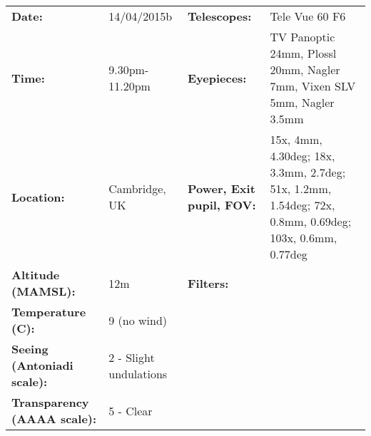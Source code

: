 \begin{tabular}{ p{1.7in} p{1.2in} p{1.5in} p{4.2in}}
{\bf Date:} & 14/04/2015b & {\bf Telescopes:} & Tele Vue 60 F6 \\ 
{\bf Time:} & 9.30pm-11.20pm & {\bf Eyepieces:} & TV Panoptic 24mm, Plossl 20mm, Nagler 7mm, Vixen SLV 5mm, Nagler 3.5mm \\ 
{\bf Location:} & Cambridge, UK & {\bf Power, Exit pupil, FOV:} & 15x, 4mm, 4.30deg; 18x, 3.3mm, 2.7deg; 51x, 1.2mm, 1.54deg; 72x, 0.8mm, 0.69deg; 103x, 0.6mm, 0.77deg \\ 
{\bf Altitude (MAMSL):} & 12m & {\bf Filters:} &  \\ 
{\bf Temperature (C):} & 9 (no wind) & & \\ 
{\bf Seeing (Antoniadi scale):} & 2 - Slight undulations & & \\ 
{\bf Transparency (AAAA scale):} & 5 - Clear & & \\ 
\end{tabular}
\centering 
